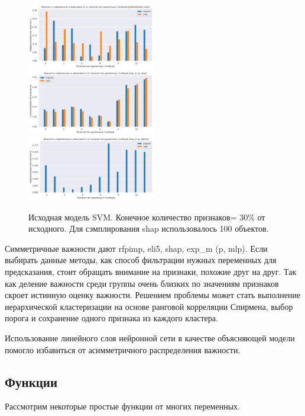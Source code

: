 \documentclass[12pt]{article}
\begin{document}
\begin{figure}[h]
        \includegraphics[width=0.5\textwidth]{images/art1_original_copy_svm_pyBreakDown (up).pdf}
        \includegraphics[width=0.5\textwidth]{images/art1_original_copy_svm_exp_m (p, mlp).pdf}
        \includegraphics[width=0.5\textwidth]{images/art1_original_copy_svm_exp_m (p, lgbm).pdf}
\caption{\centering Исходная модель SVM. Конечное количество признаков= 30\% от исходного. Для сэмплирования shap использовалось 100 объектов.}
\end{figure}

Симметричные важности дают rfpimp, eli5, shap, exp\_m (p, mlp). Если выбирать данные методы, как способ фильтрации нужных переменных для предсказания, стоит обращать внимание на признаки, похожие друг на друг. Так как деление важности среди группы очень близких по значениям признаков скроет истинную оценку важности. Решением проблемы может стать выполнение иерархической кластеризации на основе ранговой корреляции Спирмена, выбор порога и сохранение одного признака из каждого кластера. 

Использование линейного слоя нейронной сети в качестве объясняющей модели помогло избавиться от асимметричного распределения важности. 

\newpage
\subsection{Функции}
Рассмотрим некоторые простые функции от многих переменных.
\end{document}

